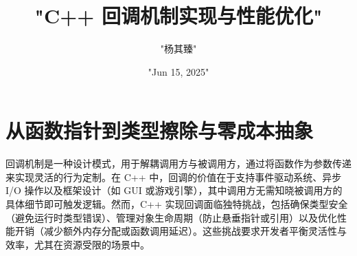 \title{"C++ 回调机制实现与性能优化"}
\author{"杨其臻"}
\date{"Jun 15, 2025"}
\maketitle
\chapter{从函数指针到类型擦除与零成本抽象}
回调机制是一种设计模式，用于解耦调用方与被调用方，通过将函数作为参数传递来实现灵活的行为定制。在 C++ 中，回调的价值在于支持事件驱动系统、异步 I/O 操作以及框架设计（如 GUI 或游戏引擎），其中调用方无需知晓被调用方的具体细节即可触发逻辑。然而，C++ 实现回调面临独特挑战，包括确保类型安全（避免运行时类型错误）、管理对象生命周期（防止悬垂指针或引用）以及优化性能开销（减少额外内存分配或函数调用延迟）。这些挑战要求开发者平衡灵活性与效率，尤其在资源受限的场景中。\par
